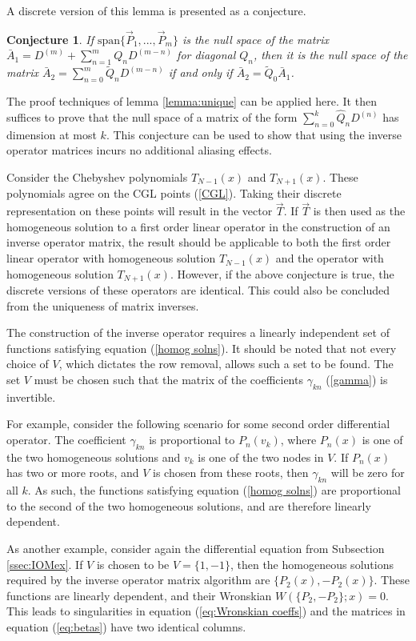 \documentclass{sfuthesis}
\newtheorem{conj}{Conjecture}
\begin{document}
A discrete version of this lemma is presented as a conjecture.

\begin{conj}
If $\text{span} \{ \vec{P}_1,...,\vec{P}_m \}$ is the null space of the matrix $\bar{A}_1 = D^{(m)} + \sum_{n=1}^m Q_n D^{(m-n)}$ for diagonal $Q_n$,
then it is the null space of the matrix $\bar{A}_2 = \sum_{n=0}^m \tilde{Q}_n D^{(m-n)}$
if and only if $\bar{A}_2 = \tilde{Q}_0 \bar{A}_1$.
\end{conj}

The proof techniques of lemma \ref{lemma:unique} can be applied here.
It then suffices to prove that the null space of a matrix of the form $\sum_{n=0}^k \hat{Q}_n D^{(n)}$ has dimension at most $k$.
This conjecture can be used to show that using the inverse operator matrices incurs no additional aliasing effects.

Consider the Chebyshev polynomials $T_{N-1}(x)$ and $T_{N+1}(x)$.
These polynomials agree on the CGL points (\ref{CGL}).
Taking their discrete representation on these points will result in the vector $\vec{T}$.
If $\vec{T}$ is then used as the homogeneous solution to a first order linear operator in the construction of an inverse operator matrix,
the result should be applicable to both the first order linear operator with homogeneous solution $T_{N-1}(x)$ and the operator with homogeneous solution $T_{N+1}(x)$.
However, if the above conjecture is true, the discrete versions of these operators are identical.
This could also be concluded from the uniqueness of matrix inverses.

The construction of the inverse operator requires a linearly independent set of functions satisfying equation (\ref{homog solns}).
It should be noted that not every choice of $V$, which dictates the row removal, allows such a set to be found.
The set $V$ must be chosen such that the matrix of the coefficients $\gamma_{kn}$ (\ref{gamma}) is invertible.

For example, consider the following scenario for some second order differential operator.
The coefficient $\gamma_{kn}$ is proportional to $P_n(v_k)$, where $P_n(x)$ is one of the two homogeneous solutions and $v_k$ is one of the two nodes in $V$.
If $P_n(x)$ has two or more roots, and $V$ is chosen from these roots, then $\gamma_{kn}$ will be zero for all $k$.
As such, the functions satisfying equation (\ref{homog solns}) are proportional to the second of the two homogeneous solutions, and are therefore linearly dependent.

As another example, consider again the differential equation from Subsection \ref{ssec:IOMex}.
If $V$ is chosen to be $V = \{ 1, -1 \}$, then the homogeneous solutions required by the inverse operator matrix algorithm are $\{ P_2(x), -P_2(x) \}$.
These functions are linearly dependent, and their Wronskian $W( \{P_2, -P_2 \}; x) =0$.
This leads to singularities in equation (\ref{eq:Wronskian coeffs}) and the matrices in equation (\ref{eq:betas}) have two identical columns.
\end{document}
